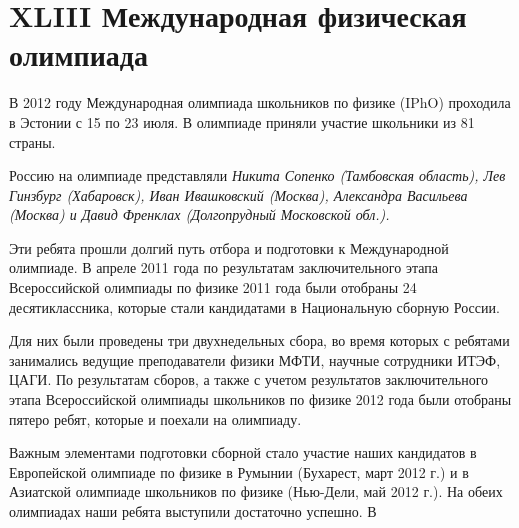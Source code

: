 \section*{\centering XLIII Международная физическая олимпиада}
\begin{multicols}{2}
    {\par\hspace*{0.2cm}В 2012 году Международная олимпиада школьников по физике (IPhO) проходила в Эстонии с 15 по 23 июля. В олимпиаде приняли участие школьники из 81 страны. }
    {\par\hspace*{0.2cm}Россию на олимпиаде представляли \textit{Никита Сопенко (Тамбовская область), Лев Гинзбург (Хабаровск), Иван Ивашковский (Москва), Александра Васильева (Москва) и Давид Френклах (Долгопрудный Московской обл.). }}
    {\par\hspace*{0.2cm}Эти ребята прошли долгий путь отбора и подготовки к Международной олимпиаде. В апреле 2011 года по результатам заключительного этапа Всероссийской олимпиады по физике 2011 года были отобраны 24 десятиклассника, которые стали кандидатами в Национальную сборную России. }
    {\par\hspace*{0.2cm}Для них были проведены три двухнедельных сбора, во время которых с ребятами занимались ведущие преподаватели физики МФТИ, научные сотрудники ИТЭФ, ЦАГИ. По результатам сборов, а также с учетом результатов заключительного этапа Всероссийской олимпиады школьников по физике 2012 года были отобраны пятеро ребят, которые и поехали на олимпиаду. }
    {\par\hspace*{0.2cm}Важным элементами подготовки сборной стало участие наших кандидатов в Европейской олимпиаде по физике в Румынии (Бухарест, март 2012 г.) и в Азиатской олимпиаде школьников по физике (Нью-Дели, май 2012 г.). На обеих олимпиадах наши ребята выступили достаточно успешно. В }
\end{multicols}
